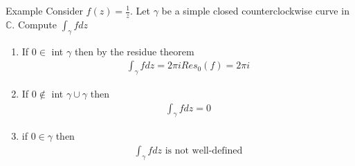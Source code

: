 	\begin{parag}{Example}
	    Consider $f\left(z\right) =  \frac{1}{z}$. Let $\gamma$ be a simple closed counterclockwise curve in $\mathbb{C}$. Compute $\int_{\gamma}fdz$
		\begin{enumerate}
		    \item If $0 \in$ int $\gamma$ then by the residue theorem 
				\begin{align*} \int_{\gamma}fdz = 2\pi i Res_{0}\left(f\right) = 2\pi i \end{align*}
				\item If $0 \notin$ int $\gamma \cup \gamma$ then 
					\begin{align*} \int_{\gamma} fdz = 0 \end{align*}
					\item if $0 \in \gamma$ then 
						\begin{align*} 
							\int_{\gamma} fdz \text{ is not well-defined}
						\end{align*}
		\end{enumerate}
		
	\end{parag}
